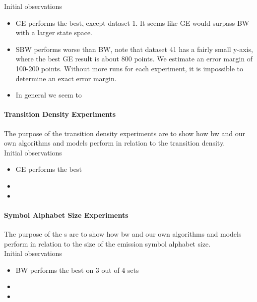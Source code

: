 	

Initial observations
\begin{itemize}
\item GE performs the best, except dataset 1. It seems like GE would surpass BW with a larger state space.
\item SBW performs worse than BW, note that dataset 41 has a fairly small y-axis, where the best GE result is about 800 points. We estimate an error margin of 100-200 points. Without more runs for each experiment, it is impossible to determine an exact error margin.
\item In general we seem to 
\end{itemize}


\paragraph{Transition Density Experiments}

The purpose of the transition density experiments are to show how \gls{bw} and our own algorithms and models perform in relation to the transition density.\\

	

Initial observations
\begin{itemize}
\item GE performs the best
\item 
\item 
\end{itemize}

\paragraph{Symbol Alphabet Size Experiments}
The purpose of the s are to show how \gls{bw} and our own algorithms and models perform in relation to the size of the emission symbol alphabet size.\\

	
	
Initial observations
\begin{itemize}
\item BW performs the best on 3 out of 4 sets
\item 
\item 
\end{itemize}	
	

